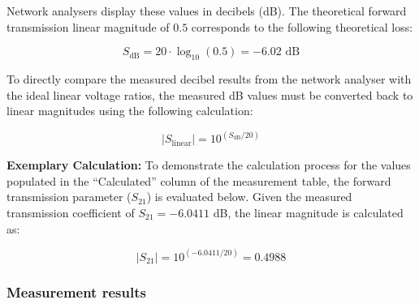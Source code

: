 Network analysers display these values in decibels (dB). The theoretical forward transmission linear magnitude of $0.5$ corresponds to the following theoretical loss:

\begin{equation}
    S_{\text{dB}} = 20 \cdot \log_{10}(0.5) = -6.02\text{ dB}
\end{equation}

To directly compare the measured decibel results from the network analyser with the ideal linear voltage ratios, the measured dB values must be converted back to linear magnitudes using the following calculation:

\begin{equation}
    |S_{\text{linear}}| = 10^{(S_{\text{dB}} / 20)}
\end{equation}

\textbf{Exemplary Calculation:} To demonstrate the calculation process for the values populated in the ``Calculated'' column of the measurement table, the forward transmission parameter ($S_{21}$) is evaluated below. Given the measured transmission coefficient of $S_{21} = -6.0411$ dB, the linear magnitude is calculated as:

\begin{equation}
    |S_{21}| = 10^{(-6.0411 / 20)} = 0.4988
\end{equation}

\subsubsection{Measurement results}

